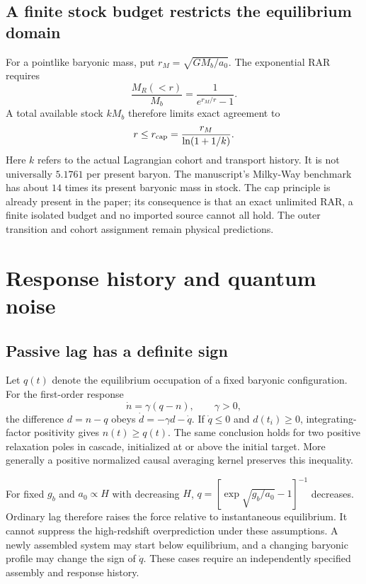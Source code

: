 \documentclass[11pt]{article}
\begin{document}
\subsection{A finite stock budget restricts the equilibrium domain}
For a pointlike baryonic mass, put $r_M=\sqrt{GM_b/a_0}$. The exponential
RAR requires
\begin{equation}
 \frac{M_R(<r)}{M_b}=\frac1{e^{r_M/r}-1}.
\end{equation}
A total available stock $kM_b$ therefore limits exact agreement to
\begin{equation}
 r\le r_{\rm cap}=\frac{r_M}{\ln(1+1/k)}.
\end{equation}
Here $k$ refers to the actual Lagrangian cohort and transport history.
It is not universally $5.1761$ per present baryon. The manuscript's Milky-Way
benchmark has about $14$ times its present baryonic mass in stock. The cap
principle is already present in the paper; its consequence is that an exact
unlimited RAR, a finite isolated budget and no imported source cannot all
hold. The outer transition and cohort assignment remain physical predictions.

\section{Response history and quantum noise}
\subsection{Passive lag has a definite sign}
Let $q(t)$ denote the equilibrium occupation of a fixed baryonic configuration.
For the first-order response
\begin{equation}
 \dot n=\gamma(q-n),\qquad \gamma>0,
\end{equation}
the difference $d=n-q$ obeys $\dot d=-\gamma d-\dot q$.
If $\dot q\le0$ and $d(t_i)\ge0$, integrating-factor positivity gives
$n(t)\ge q(t)$. The same conclusion holds for two positive relaxation poles
in cascade, initialized at or above the initial target. More generally a
positive normalized causal averaging kernel preserves this inequality.

For fixed $g_b$ and $a_0\propto H$ with decreasing $H$,
$q=[\exp\sqrt{g_b/a_0}-1]^{-1}$ decreases. Ordinary lag therefore raises
the force relative to instantaneous equilibrium. It cannot suppress the
high-redshift overprediction under these assumptions. A newly assembled
system may start below equilibrium, and a changing baryonic profile may
change the sign of $\dot q$. These cases require an independently specified
assembly and response history.
\end{document}
